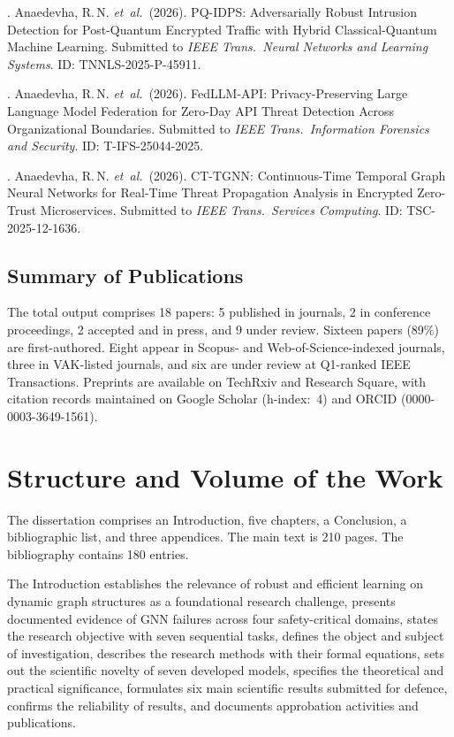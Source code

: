 . Anaedevha, R.\,N. \textit{et~al.}\ (2026). PQ-IDPS: Adversarially Robust Intrusion Detection for Post-Quantum Encrypted Traffic with Hybrid Classical-Quantum Machine Learning. Submitted to \textit{IEEE Trans.\ Neural Networks and Learning Systems}. ID: TNNLS-2025-P-45911.

. Anaedevha, R.\,N. \textit{et~al.}\ (2026). FedLLM-API: Privacy-Preserving Large Language Model Federation for Zero-Day API Threat Detection Across Organizational Boundaries. Submitted to \textit{IEEE Trans.\ Information Forensics and Security}. ID: T-IFS-25044-2025.

. Anaedevha, R.\,N. \textit{et~al.}\ (2026). CT-TGNN: Continuous-Time Temporal Graph Neural Networks for Real-Time Threat Propagation Analysis in Encrypted Zero-Trust Microservices. Submitted to \textit{IEEE Trans.\ Services Computing}. ID: TSC-2025-12-1636.

\subsection*{Summary of Publications}

The total output comprises 18 papers: 5 published in journals, 2 in conference proceedings, 2 accepted and in press, and 9 under review. Sixteen papers (89\%) are first-authored. Eight appear in Scopus- and Web-of-Science-indexed journals, three in VAK-listed journals, and six are under review at Q1-ranked IEEE Transactions. Preprints are available on TechRxiv and Research Square, with citation records maintained on Google Scholar (h-index:~4) and ORCID (0000-0003-3649-1561).


\section*{Structure and Volume of the Work}

The dissertation comprises an Introduction, five chapters, a Conclusion, a bibliographic list, and three appendices. The main text is 210 pages. The bibliography contains 180 entries.

The Introduction establishes the relevance of robust and efficient learning on dynamic graph structures as a foundational research challenge, presents documented evidence of GNN failures across four safety-critical domains, states the research objective with seven sequential tasks, defines the object and subject of investigation, describes the research methods with their formal equations, sets out the scientific novelty of seven developed models, specifies the theoretical and practical significance, formulates six main scientific results submitted for defence, confirms the reliability of results, and documents approbation activities and publications.

